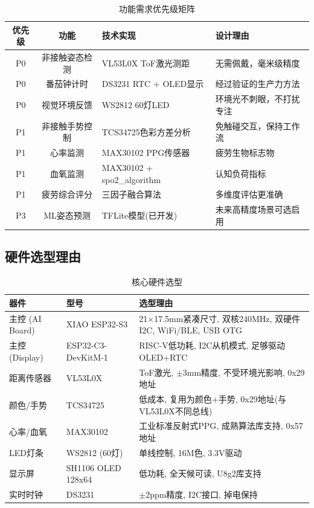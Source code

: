 \documentclass[UTF8,a4paper,12pt]{ctexart}
\begin{document}
\begin{table}[H]
\centering
\caption{功能需求优先级矩阵}
\begin{tabular}{@{}cclp{6cm}@{}}
\toprule
\textbf{优先级} & \textbf{功能} & \textbf{技术实现} & \textbf{设计理由} \\
\midrule
P0 & 非接触姿态检测 & VL53L0X ToF激光测距 & 无需佩戴，毫米级精度 \\
P0 & 番茄钟计时 & DS3231 RTC + OLED显示 & 经过验证的生产力方法 \\
P0 & 视觉环境反馈 & WS2812 60灯LED & 环境光不刺眼，不打扰专注 \\
P1 & 非接触手势控制 & TCS34725色彩方差分析 & 免触碰交互，保持工作流 \\
P1 & 心率监测 & MAX30102 PPG传感器 & 疲劳生物标志物 \\
P1 & 血氧监测 & MAX30102 + spo2\_algorithm & 认知负荷指标 \\
P1 & 疲劳综合评分 & 三因子融合算法 & 多维度评估更准确 \\
P3 & ML姿态预测 & TFLite模型(已开发) & 未来高精度场景可选启用 \\
\bottomrule
\end{tabular}
\end{table}

\subsection{硬件选型理由}

\begin{table}[H]
\centering
\caption{核心硬件选型}
\begin{tabular}{@{}p{3.5cm}p{3.5cm}p{6.5cm}@{}}
\toprule
\textbf{器件} & \textbf{型号} & \textbf{选型理由} \\
\midrule
主控 (AI Board) & XIAO ESP32-S3 & 21$\times$17.5mm紧凑尺寸, 双核240MHz, 双硬件I2C, WiFi/BLE, USB OTG \\
主控 (Display) & ESP32-C3-DevKitM-1 & RISC-V低功耗, I2C从机模式, 足够驱动OLED+RTC \\
距离传感器 & VL53L0X & ToF激光, $\pm$3mm精度, 不受环境光影响, 0x29地址 \\
颜色/手势 & TCS34725 & 低成本, 复用为颜色+手势, 0x29地址(与VL53L0X不同总线) \\
心率/血氧 & MAX30102 & 工业标准反射式PPG, 成熟算法库支持, 0x57地址 \\
LED灯条 & WS2812 (60灯) & 单线控制, 16M色, 3.3V驱动 \\
显示屏 & SH1106 OLED 128x64 & 低功耗, 全天候可读, U8g2库支持 \\
实时时钟 & DS3231 & $\pm$2ppm精度, I2C接口, 掉电保持 \\
\bottomrule
\end{tabular}
\end{table}
\end{document}
